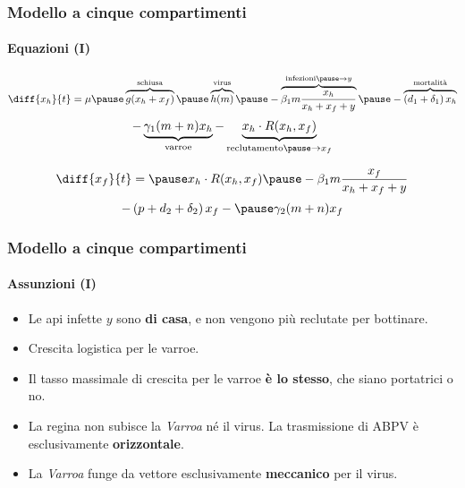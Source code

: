 \documentclass[]{beamer} %
\begin{document}
%
%


\begin{frame}
    \frametitle{Modello a cinque compartimenti}
    \framesubtitle{Equazioni (I)}

    $$ \diff{x_h}{t} = \mu \pause \overbrace{ g( x_h + x_f ) }^{\text{schiusa}} %
        \pause \overbrace{ h(m) }^{\text{virus}} %
        \pause - \overbrace{ \beta_1 m \frac{x_h}{x_h + x_f + y} }^{\text{infezioni} \pause \to y} %
        \pause - \overbrace{ \left( d_1 + \delta_1 \right) x_h }^{\text{mortalità}} $$
    \pause
    $$ - \underbrace{ \gamma_1 (m+n) x_h }_{\text{varroe}} %
        - \underbrace{ x_h \cdot R(x_h, x_f) }_{\text{reclutamento} \pause \to x_f}  $$

    $$ \diff{x_f}{t} = \pause  x_h \cdot R(x_h, x_f)  %
    \pause - \beta_1 m \frac{x_f}{x_h + x_f + y} $$
    \pause
    $$ - \left( p + d_2 + \delta_2 \right) x_f %
    - \pause \gamma_2 (m+n) x_f $$
\end{frame}

\begin{frame}
    \frametitle{Modello a cinque compartimenti}
    \framesubtitle{Assunzioni (I)}

    \begin{itemize}
        \item \pause Le api infette $y$ sono \textbf{di casa},
            e non vengono più reclutate per bottinare.
        \item \pause Crescita logistica per le varroe.
        \item \pause Il tasso massimale di crescita per le varroe \textbf{è lo stesso},
            che siano portatrici o no.
        \item \pause La regina non subisce la \emph{Varroa} né il virus.
            \pause La trasmissione di ABPV è esclusivamente \textbf{orizzontale}.
        \item \pause La \emph{Varroa} funge da vettore esclusivamente \textbf{meccanico} per il virus.
    \end{itemize}
\end{frame}
\end{document}
